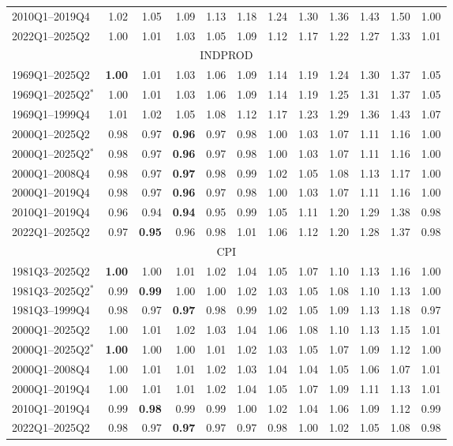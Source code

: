 \begin{tabular}{lrrrrrrrrrrr}
2010Q1--2019Q4 & 1.02 & 1.05 & 1.09 & 1.13 & 1.18 & 1.24 & 1.30 & 1.36 & 1.43 & 1.50 & 1.00 \\
2022Q1--2025Q2 & 1.00 & 1.01 & 1.03 & 1.05 & 1.09 & 1.12 & 1.17 & 1.22 & 1.27 & 1.33 & 1.01 \\
\hline
\multicolumn{12}{c}{INDPROD} \\
1969Q1--2025Q2 & \textbf{1.00} & 1.01 & 1.03 & 1.06 & 1.09 & 1.14 & 1.19 & 1.24 & 1.30 & 1.37 & 1.05 \\
1969Q1--2025Q2$^*$ & 1.00 & 1.01 & 1.03 & 1.06 & 1.09 & 1.14 & 1.19 & 1.25 & 1.31 & 1.37 & 1.05 \\
1969Q1--1999Q4 & 1.01 & 1.02 & 1.05 & 1.08 & 1.12 & 1.17 & 1.23 & 1.29 & 1.36 & 1.43 & 1.07 \\
2000Q1--2025Q2 & 0.98 & 0.97 & \textbf{0.96} & 0.97 & 0.98 & 1.00 & 1.03 & 1.07 & 1.11 & 1.16 & 1.00 \\
2000Q1--2025Q2$^*$ & 0.98 & 0.97 & \textbf{0.96} & 0.97 & 0.98 & 1.00 & 1.03 & 1.07 & 1.11 & 1.16 & 1.00 \\
2000Q1--2008Q4 & 0.98 & 0.97 & \textbf{0.97} & 0.98 & 0.99 & 1.02 & 1.05 & 1.08 & 1.13 & 1.17 & 1.00 \\
2000Q1--2019Q4 & 0.98 & 0.97 & \textbf{0.96} & 0.97 & 0.98 & 1.00 & 1.03 & 1.07 & 1.11 & 1.16 & 1.00 \\
2010Q1--2019Q4 & 0.96 & 0.94 & \textbf{0.94} & 0.95 & 0.99 & 1.05 & 1.11 & 1.20 & 1.29 & 1.38 & 0.98 \\
2022Q1--2025Q2 & 0.97 & \textbf{0.95} & 0.96 & 0.98 & 1.01 & 1.06 & 1.12 & 1.20 & 1.28 & 1.37 & 0.98 \\
\hline
\multicolumn{12}{c}{CPI} \\
1981Q3--2025Q2 & \textbf{1.00} & 1.00 & 1.01 & 1.02 & 1.04 & 1.05 & 1.07 & 1.10 & 1.13 & 1.16 & 1.00 \\
1981Q3--2025Q2$^*$ & 0.99 & \textbf{0.99} & 1.00 & 1.00 & 1.02 & 1.03 & 1.05 & 1.08 & 1.10 & 1.13 & 1.00 \\
1981Q3--1999Q4 & 0.98 & 0.97 & \textbf{0.97} & 0.98 & 0.99 & 1.02 & 1.05 & 1.09 & 1.13 & 1.18 & 0.97 \\
2000Q1--2025Q2 & 1.00 & 1.01 & 1.02 & 1.03 & 1.04 & 1.06 & 1.08 & 1.10 & 1.13 & 1.15 & 1.01 \\
2000Q1--2025Q2$^*$ & \textbf{1.00} & 1.00 & 1.00 & 1.01 & 1.02 & 1.03 & 1.05 & 1.07 & 1.09 & 1.12 & 1.00 \\
2000Q1--2008Q4 & 1.00 & 1.01 & 1.01 & 1.02 & 1.03 & 1.04 & 1.04 & 1.05 & 1.06 & 1.07 & 1.01 \\
2000Q1--2019Q4 & 1.00 & 1.01 & 1.01 & 1.02 & 1.04 & 1.05 & 1.07 & 1.09 & 1.11 & 1.13 & 1.01 \\
2010Q1--2019Q4 & 0.99 & \textbf{0.98} & 0.99 & 0.99 & 1.00 & 1.02 & 1.04 & 1.06 & 1.09 & 1.12 & 0.99 \\
2022Q1--2025Q2 & 0.98 & 0.97 & \textbf{0.97} & 0.97 & 0.97 & 0.98 & 1.00 & 1.02 & 1.05 & 1.08 & 0.98 \\
\hline
\end{tabular}
